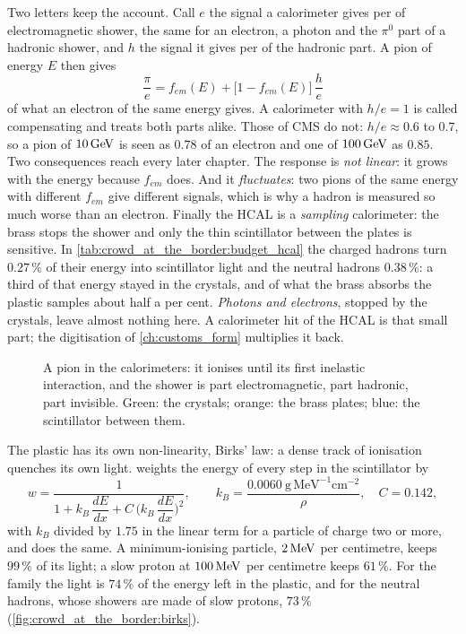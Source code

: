 Two letters keep the account. Call $e$ the signal a calorimeter gives per
\GeV of electromagnetic shower, the same for an electron, a photon and the
$\pi^0$ part of a hadronic shower, and $h$ the signal it gives per \GeV of
the hadronic part. A pion of energy $E$ then gives
\begin{equation}
  \frac{\pi}{e}=f_{em}(E)+\big[1-f_{em}(E)\big]\,\frac{h}{e}
  \label{eq:crowd_at_the_border:pie}
\end{equation}
of what an electron of the same energy gives. A calorimeter with $h/e=1$
is called compensating and treats both parts alike. Those of CMS do not:
$h/e\approx0.6$ to $0.7$, so a pion of $10\,\mathrm{GeV}$ is seen as $0.78$ of an
electron and one of $100\,\mathrm{GeV}$ as $0.85$. Two consequences reach every
later chapter. The response is \emph{not linear}: it grows with the energy
because $f_{em}$ does. And it \emph{fluctuates}: two pions of the same
energy with different $f_{em}$ give different signals, which is why a
hadron is measured so much worse than an electron. Finally the HCAL is a \emph{sampling}
calorimeter: the brass stops the shower and only the thin scintillator
between the plates is sensitive. In \cref{tab:crowd_at_the_border:budget_hcal}
the charged hadrons turn $0.27\,\%$
of their energy into scintillator light and the neutral hadrons
$0.38\,\%$:
a third of that energy stayed in the crystals, and of what the brass
absorbs the plastic samples about half a per cent. \emph{Photons and
electrons}, stopped by the crystals, leave almost nothing here. A
calorimeter hit of the HCAL is that small part; the digitisation of
\cref{ch:customs_form} multiplies it back.

\begin{figure}[htbp]\centering
\resizebox{\textwidth}{!}{}
\caption[The hadronic shower]{A pion in the calorimeters: it ionises until
its first inelastic interaction, and the shower is part electromagnetic,
part hadronic, part invisible. Green: the crystals; orange: the brass
plates; blue: the scintillator between them.}
\label{fig:crowd_at_the_border:had_sketch}
\end{figure}

The plastic has its own non-linearity, Birks' law: a dense track of
ionisation quenches its own light. \CMSSW weights the energy of every step
in the scintillator by
\begin{equation}
  w=\frac{1}{1+k_B\,\dfrac{dE}{dx}+C\,\Big(k_B\,\dfrac{dE}{dx}\Big)^{2}},
  \qquad k_B=\frac{0.0060\ \mathrm{g\,MeV^{-1}cm^{-2}}}{\rho},\quad C=0.142 ,
  \label{eq:crowd_at_the_border:birks}
\end{equation}
with $k_B$ divided by $1.75$ in the linear term for a particle of charge two
or more, and
 does the same. A minimum-ionising particle, $2\,\mathrm{MeV}$
per centimetre, keeps $99\,\%$ of its light; a slow proton at
$100\,\mathrm{MeV}$ per centimetre keeps $61\,\%$. For the family the light is
$74\,\%$ of the energy
left in the plastic, and for the neutral hadrons, whose showers are made of
slow protons, $73\,\%$ (\cref{fig:crowd_at_the_border:birks}).

